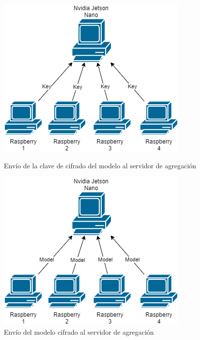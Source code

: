 \begin{figure}[H]
    \begin{minipage}[t]{0.45\linewidth}  %
        \centering
        \includegraphics[width=\textwidth]{Figuras/Network_participant_encrypted_key.png}
        \caption{Envío de la clave de cifrado del modelo al servidor de agregación} 
    \end{minipage}
    \hfill
    \begin{minipage}[t]{0.45\linewidth}  %
        \centering
        \includegraphics[width=\textwidth]{Figuras/Network_participant_encrypted_model.png}    
        \caption{Envío del modelo cifrado al servidor de agregación} 
    \end{minipage}
\end{figure}

